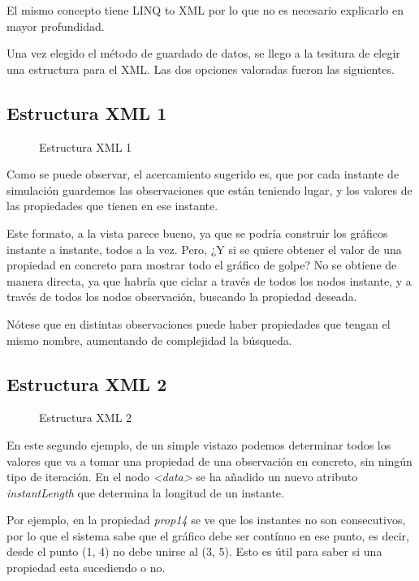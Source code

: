 El mismo concepto tiene LINQ to XML por lo que no es necesario explicarlo en mayor profundidad.

Una vez elegido el m\'etodo de guardado de datos, se llego a la tesitura de elegir una estructura para el XML.
Las dos opciones valoradas fueron las siguientes.

\subsection{Estructura XML 1}
\begin{figure}[H]
	
	\caption[Estructura XML 1]{Estructura XML 1}
	\label{Estructura XML1}
\end{figure}


Como se puede observar, el acercamiento sugerido es, que por cada instante de simulaci\'{o}n guardemos las observaciones que 
est\'{a}n teniendo lugar,
y los valores de las propiedades que tienen en ese instante.

Este formato, a la vista parece bueno, ya que se podr\'{i}a construir los gr\'{a}ficos instante a instante, todos a la vez. 
Pero, ¿Y si se quiere
obtener el valor de una propiedad en concreto para mostrar todo el gr\'{a}fico de golpe? No se obtiene de manera directa, ya que 
habr\'{i}a que ciclar
a trav\'{e}s de todos los nodos instante, y a trav\'{e}s de todos los nodos observaci\'{o}n, buscando la propiedad deseada. 

N\'{o}tese que en distintas observaciones puede haber propiedades que tengan el mismo nombre, aumentando de complejidad la 
b\'{u}squeda.

\subsection{Estructura XML 2}
\begin{figure}[H]
	
	\caption[Estructura XML 2]{Estructura XML 2}
	\label{Estructura XML2}
\end{figure}

En este segundo ejemplo, de un simple vistazo podemos determinar todos los valores que va a tomar una propiedad de una 
observaci\'{o}n en concreto,
sin ning\'{u}n tipo de iteraci\'{o}n. En el nodo \emph{<data>} se ha a\~{n}adido un nuevo atributo \emph{instantLength} que 
determina la longitud de un instante. 

Por ejemplo, en la propiedad \emph{prop14} se ve que los instantes no son consecutivos, por lo que el sistema sabe que el 
gr\'{a}fico debe ser cont\'inuo en ese punto, es decir, desde el punto (1, 4) no debe unirse al 
(3, 5). Esto es \'{u}til para saber si una propiedad esta sucediendo o no.

